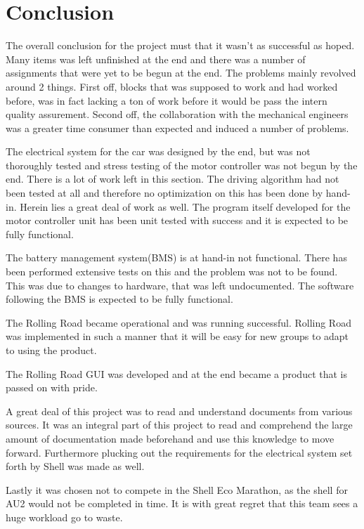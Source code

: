 \chapter{Conclusion}
The overall conclusion for the project must that it wasn't as successful as hoped. Many items was left unfinished at the end and there was a number of assignments that were yet to be begun at the end. The problems mainly revolved around 2 things. First off, blocks that was supposed to work and had worked before, was in fact lacking a ton of work before it would be pass the intern quality assurement. Second off, the collaboration with the mechanical engineers was a greater time consumer than expected and induced a number of problems.   

The electrical system for the car was designed by the end, but was not thoroughly tested and stress testing of the motor controller was not begun by the end. There is a lot of work left in this section. The driving algorithm had not been tested at all and therefore no optimization on this has been done by hand-in. Herein lies a great deal of work as well. The program itself developed for the motor controller unit has been unit tested with success and it is expected to be fully functional. 

The battery management system(BMS) is at hand-in not functional. There has been performed extensive tests on this and the problem was not to be found. This was due to changes to hardware, that was left undocumented. The software following the BMS is expected to be fully functional. 

The Rolling Road became operational and was running successful. Rolling Road was implemented in such a manner that it will be easy for new groups to adapt to using the product. 

The Rolling Road GUI was developed and at the end became a product that is passed on with pride.

A great deal of this project was to read and understand documents from various sources. It was an integral part of this project to read and comprehend the large amount of documentation made beforehand and use this knowledge to move forward. Furthermore plucking out the requirements for the electrical system set forth by Shell was made as well.

Lastly it was chosen not to compete in the Shell Eco Marathon, as the shell for AU2 would not be completed in time. It is with great regret that this team sees a huge workload go to waste. 
